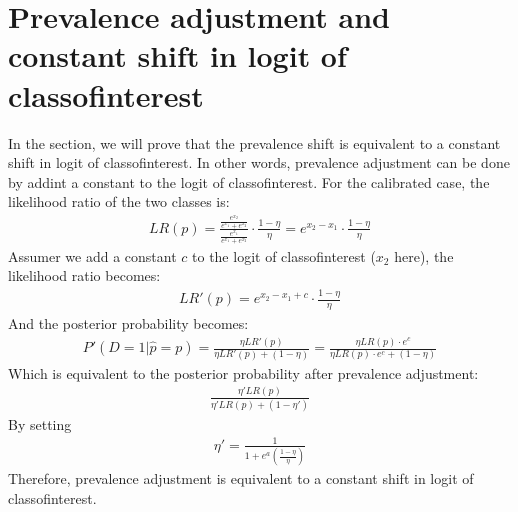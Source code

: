\documentclass[letterpaper,10pt,english]{sphinxmanual}
\begin{document}
\section{Prevalence adjustment and constant shift in logit of class\sphinxhyphen{}of\sphinxhyphen{}interest}
\label{\detokenize{notebooks/prevalence_adjustment:Prevalence-adjustment-and-constant-shift-in-logit-of-class-of-interest}}
\sphinxAtStartPar
In the section, we will prove that the prevalence shift is equivalent to a constant shift in logit of class\sphinxhyphen{}of\sphinxhyphen{}interest. In other words, prevalence adjustment can be done by addint a constant to the logit of class\sphinxhyphen{}of\sphinxhyphen{}interest. For the calibrated case, the likelihood ratio of the two classes is:
\begin{equation*}
\begin{split}LR(p) = \frac{\frac{e^{x_2}}{e^{x_1} + e^{x_2}}}{\frac{e^{x_1}}{e^{x_1} + e^{x_2}}} \cdot \frac{1-\eta}{\eta} = e^{x_2 - x_1} \cdot \frac{1-\eta}{\eta}\end{split}
\end{equation*}
\sphinxAtStartPar
Assumer we add a constant \(c\) to the logit of class\sphinxhyphen{}of\sphinxhyphen{}interest (\(x_2\) here), the likelihood ratio becomes:
\begin{equation*}
\begin{split}LR'(p) = e^{x_2 - x_1 + c} \cdot \frac{1-\eta}{\eta}\end{split}
\end{equation*}
\sphinxAtStartPar
And the posterior probability becomes:
\begin{equation*}
\begin{split}P'(D=1|\hat{p}=p) = \frac{\eta LR'(p)}{\eta LR'(p) + (1-\eta)} = \frac{\eta LR(p) \cdot e^c}{\eta LR(p) \cdot e^c + (1-\eta)}\end{split}
\end{equation*}
\sphinxAtStartPar
Which is equivalent to the posterior probability after prevalence adjustment:
\begin{equation*}
\begin{split}\frac{\eta' LR(p)}{\eta' LR(p) + (1-\eta')}\end{split}
\end{equation*}
\sphinxAtStartPar
By setting
\begin{equation*}
\begin{split}\eta' = \frac{1}{1 + e^a \left(\frac{1-\eta}{\eta}\right)}\end{split}
\end{equation*}
\sphinxAtStartPar
Therefore, prevalence adjustment is equivalent to a constant shift in logit of class\sphinxhyphen{}of\sphinxhyphen{}interest.
\end{document}
